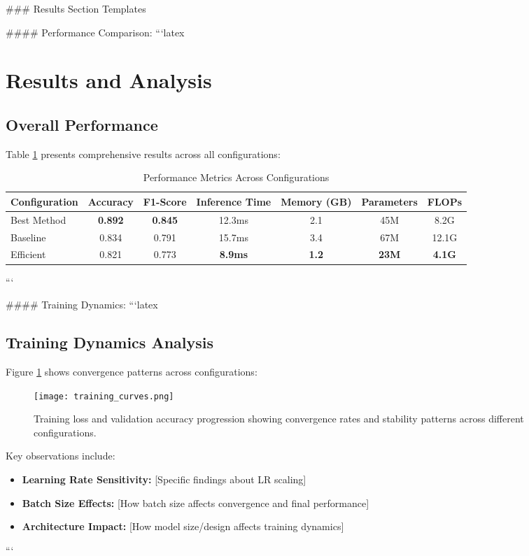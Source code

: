 \documentclass[11pt,a4paper]{article}
\begin{document}
### Results Section Templates

#### Performance Comparison:
```latex
\section{Results and Analysis}

\subsection{Overall Performance}
Table \ref{tab:performance} presents comprehensive results across all configurations:

\begin{table}[H]
\centering
\caption{Performance Metrics Across Configurations}
\label{tab:performance}
\begin{tabular}{@{}lcccccc@{}}
\toprule
Configuration & Accuracy & F1-Score & Inference Time & Memory (GB) & Parameters & FLOPs \\
\midrule
Best Method & \textbf{0.892} & \textbf{0.845} & 12.3ms & 2.1 & 45M & 8.2G \\
Baseline & 0.834 & 0.791 & 15.7ms & 3.4 & 67M & 12.1G \\
Efficient & 0.821 & 0.773 & \textbf{8.9ms} & \textbf{1.2} & \textbf{23M} & \textbf{4.1G} \\
\bottomrule
\end{tabular}
\end{table}
```

#### Training Dynamics:
```latex
\subsection{Training Dynamics Analysis}
Figure \ref{fig:training} shows convergence patterns across configurations:

\begin{figure}[H]
    \centering
    \texttt{[image: training\_curves.png]}
    \caption{Training loss and validation accuracy progression showing convergence rates and stability patterns across different configurations.}
    \label{fig:training}
\end{figure}

Key observations include:
\begin{itemize}
    \item \textbf{Learning Rate Sensitivity:} [Specific findings about LR scaling]
    \item \textbf{Batch Size Effects:} [How batch size affects convergence and final performance]
    \item \textbf{Architecture Impact:} [How model size/design affects training dynamics]
\end{itemize}
```
\end{document}
